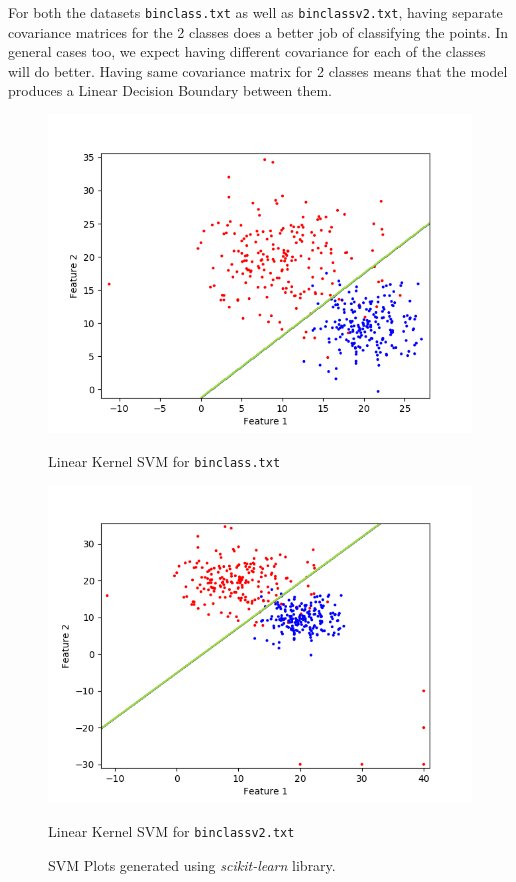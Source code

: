 \documentclass[a4paper,11pt]{article}
\begin{document}
\begin{mlsolution}
    For both the datasets \texttt{binclass.txt} as well as \texttt{binclassv2.txt}, having separate covariance matrices for the 2 classes does a better job of classifying the points.
    In general cases too, we expect having different covariance for each of the classes will do better. Having same covariance matrix for 2 classes means that the model produces a Linear Decision Boundary between them.

    \begin{figure}[h]
        \centering
        \begin{minipage}{0.5\textwidth}
            \centering
            \includegraphics[width=\textwidth]{Part1_Task3.png} %
            \caption*{Linear Kernel SVM for \texttt{binclass.txt}}
        \end{minipage}\hfill
        \begin{minipage}{0.5\textwidth}
            \centering
            \includegraphics[width=\textwidth]{Part2_Task3.png} %
            \caption*{Linear Kernel SVM for \texttt{binclassv2.txt}}
        \end{minipage}
        \caption{SVM Plots generated using \textsl{scikit-learn} library.}
    \end{figure}

\end{mlsolution}
\end{document}
